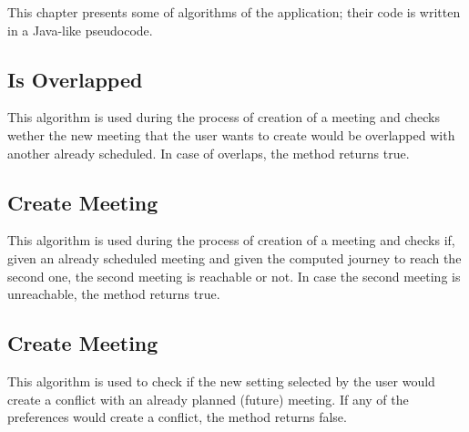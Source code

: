 This chapter presents some of algorithms of the application; their code is written in a Java-like pseudocode.



 
\lstset{style=mystyle}

\subsection{Is Overlapped}
This algorithm is used during the process of creation of a meeting and checks wether the new meeting that the user wants to create would be overlapped with another already scheduled.
In case of overlaps, the method returns true.


\subsection{Create Meeting}
This algorithm is used during the process of creation of a meeting and checks if, given an already scheduled meeting and given the computed journey to reach the second one, the second meeting is reachable or not.
In case the second meeting is unreachable, the method returns true.



\subsection{Create Meeting}
This algorithm is used to check if the new setting selected by the user would create a conflict with an already planned (future) meeting.
If any of the preferences would create a conflict, the method returns false.


